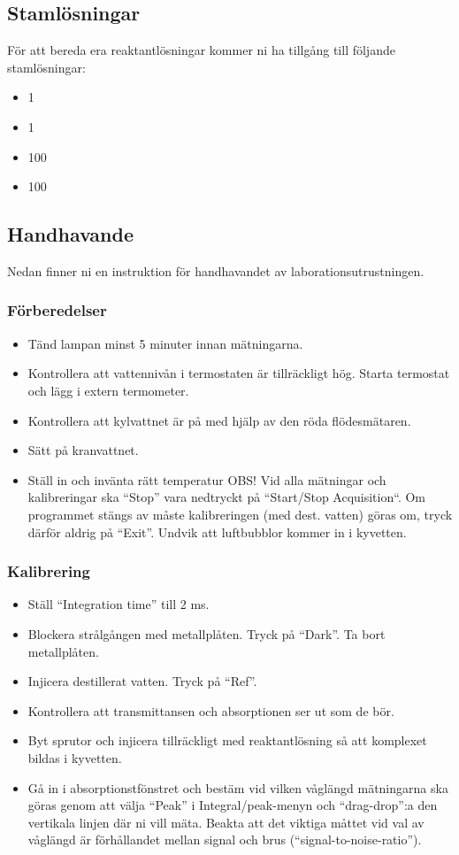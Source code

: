 \subsection{Stamlösningar}
För att bereda era reaktantlösningar kommer ni ha tillgång till följande
stamlösningar:

\begin{itemize}
\item \SI{1}{\Molar} 
\item \SI{1}{\Molar} 
\item \SI{100}{\milli\Molar} 
\item \SI{100}{\milli\Molar} 
\end{itemize}

\subsection{Handhavande}
\label{sec:handhavande}
Nedan finner ni en instruktion för handhavandet av
laborationsutrustningen.

\subsubsection{Förberedelser}
\begin{itemize}
\item Tänd lampan minst 5 minuter innan mätningarna.
\item Kontrollera att vattennivån i termostaten är tillräckligt hög.
Starta termostat och lägg i extern termometer.
\item Kontrollera att kylvattnet är på med hjälp av den röda flödesmätaren.
\item Sätt på kranvattnet.
\item Ställ in och invänta rätt temperatur
OBS! Vid alla mätningar och kalibreringar ska ``Stop'' vara nedtryckt på ``Start/Stop
Acquisition``. Om programmet stängs av måste kalibreringen (med dest. vatten) göras om,
tryck därför aldrig på ``Exit''. Undvik att luftbubblor kommer in i kyvetten.
\end{itemize}
\subsubsection{Kalibrering}
\begin{itemize}
\item Ställ ``Integration time'' till 2 ms.
\item Blockera strålgången med metallplåten. Tryck på ``Dark''. Ta bort metallplåten.
\item Injicera destillerat vatten. Tryck på ``Ref''.
\item Kontrollera att transmittansen och absorptionen ser ut som de bör.
\item Byt sprutor och injicera tillräckligt med reaktantlösning så att komplexet bildas i kyvetten.
\item Gå in i absorptionstfönstret och bestäm vid vilken våglängd mätningarna ska göras genom
att välja ``Peak'' i Integral/peak-menyn och ``drag-drop'':a den
vertikala linjen där ni vill mäta. Beakta att det viktiga måttet vid val
av våglängd är förhållandet mellan signal och brus (``signal-to-noise-ratio'').
\end{itemize}
